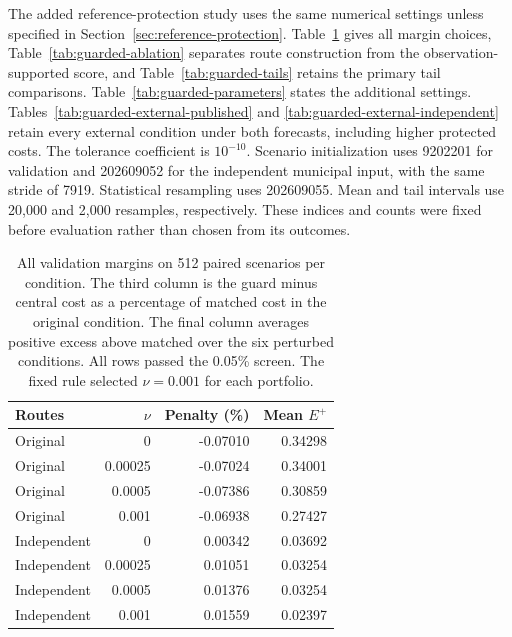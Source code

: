 \documentclass[journal]{IEEEtran}
\providecommand{\DIFadd}[1]{{\protect\color{blue}\uwave{#1}}} %
\newcommand{\DIFnewtablecolor}{\color{blue}}
\renewcommand{\DIFadd}[1]{{\color{blue}#1}}
\begin{document}
\DIFadd{The added reference-protection study uses the same numerical settings unless
specified in Section~\ref{sec:reference-protection}.
Table~\ref{tab:guarded-validation} gives all margin choices,
Table~\ref{tab:guarded-ablation} separates route construction from the
observation-supported score, and Table~\ref{tab:guarded-tails} retains the
primary tail comparisons. Table~\ref{tab:guarded-parameters} states the
additional settings. Tables~\ref{tab:guarded-external-published} and
\ref{tab:guarded-external-independent} retain every external condition
under both forecasts, including higher protected costs.
The tolerance coefficient is $10^{-10}$.
Scenario initialization uses 9202201 for validation and 202609052 for the
independent municipal input, with the same stride of 7919. Statistical
resampling uses 202609055. Mean and tail intervals use 20,000 and 2,000
resamples, respectively. These indices and counts were fixed before
evaluation rather than chosen from its outcomes.
}\begin{table}[t]\DIFnewtablecolor
\centering
\caption{All validation margins on 512 paired scenarios per condition. The third column is the guard minus central cost as a percentage of matched cost in the original condition. The final column averages positive excess above matched over the six perturbed conditions. All rows passed the 0.05\% screen. The fixed rule selected $\nu=0.001$ for each portfolio.}
\label{tab:guarded-validation}
\footnotesize\setlength{\tabcolsep}{3pt}\renewcommand{\arraystretch}{1.12}
\begin{tabular}{@{}lrrr@{}}
\toprule
Routes & $\nu$ & Penalty (\%) & Mean $E^+$ \\
\midrule
Original & 0 & -0.07010 & 0.34298 \\
Original & 0.00025 & -0.07024 & 0.34001 \\
Original & 0.0005 & -0.07386 & 0.30859 \\
Original & 0.001 & -0.06938 & 0.27427 \\
Independent & 0 & 0.00342 & 0.03692 \\
Independent & 0.00025 & 0.01051 & 0.03254 \\
Independent & 0.0005 & 0.01376 & 0.03254 \\
Independent & 0.001 & 0.01559 & 0.02397 \\
\bottomrule
\end{tabular}
\end{table}
\end{document}
